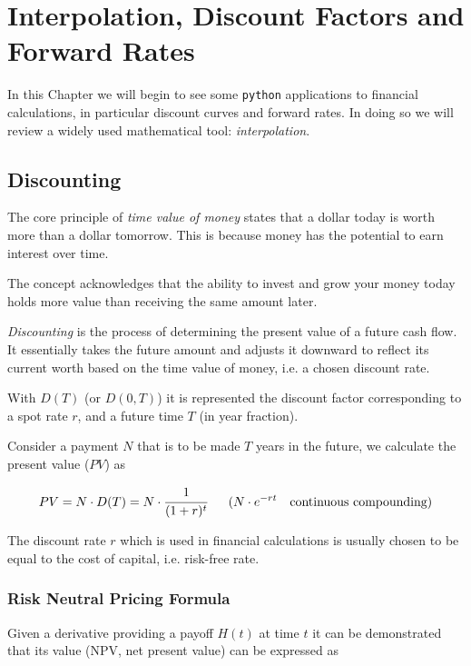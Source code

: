 \chapter{Interpolation, Discount Factors and Forward Rates}
\label{interpolation}

In this Chapter we will begin to see some \texttt{python} applications to financial calculations, in particular discount curves and forward rates. In doing so we will review a widely used mathematical tool: \emph{interpolation}.

\section{Discounting}
\label{discount-factors}

The core principle of \emph{time value of money} states that a dollar today is worth more than a dollar tomorrow. This is because money has the potential to earn interest over time.

The concept acknowledges that the ability to invest and grow your money today holds more value than receiving the same amount later.

\emph{Discounting} is the process of determining the present value of a future cash flow. It essentially takes the future amount and adjusts it downward to reflect its current worth based on the time value of money, i.e. a chosen discount rate.

With $D(T)$ (or $D(0,T)$) it is represented the discount factor corresponding to a spot rate $r$, and a future time $T$ (in year fraction). 

Consider a payment $N$ that is to be made $T$ years in the future, we calculate the present value ($PV$) as

\begin{equation}
PV = N\cdot D(T) = N \cdot \cfrac{1}{(1 + r)^t}~~~~~
(N \cdot e^{-rt}~~~\text{continuous compounding})
\label{eq:discount_factor}
\end{equation}

The discount rate $r$ which is used in financial calculations is usually chosen to be equal to the cost of capital, i.e. risk-free rate.

\subsection{Risk Neutral Pricing Formula}

Given a derivative providing a payoff $H(t)$ at time $t$ it can be demonstrated that its value (NPV, net present value) can be expressed as

